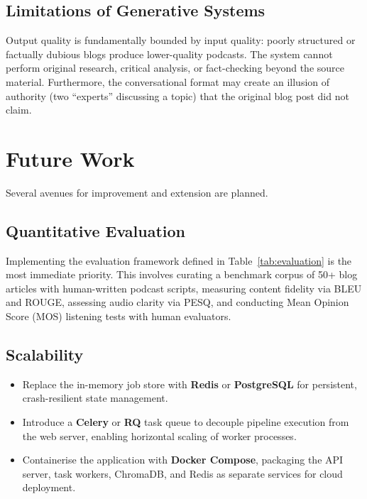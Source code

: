 \documentclass[sigconf,natbib=false]{acmart}   %
\begin{document}
\subsection{Limitations of Generative Systems}
Output quality is fundamentally bounded by input quality: poorly structured or factually dubious blogs produce lower-quality podcasts.  The system cannot perform original research, critical analysis, or fact-checking beyond the source material.  Furthermore, the conversational format may create an illusion of authority (two ``experts'' discussing a topic) that the original blog post did not claim.

\section{Future Work}
\label{sec:future}

Several avenues for improvement and extension are planned.

\subsection{Quantitative Evaluation}
Implementing the evaluation framework defined in Table~\ref{tab:evaluation} is the most immediate priority.  This involves curating a benchmark corpus of 50+ blog articles with human-written podcast scripts, measuring content fidelity via BLEU and ROUGE, assessing audio clarity via PESQ, and conducting Mean Opinion Score (MOS) listening tests with human evaluators.

\subsection{Scalability}
\begin{itemize}[nosep]
  \item Replace the in-memory job store with \textbf{Redis} or \textbf{PostgreSQL} for persistent, crash-resilient state management.
  \item Introduce a \textbf{Celery} or \textbf{RQ} task queue to decouple pipeline execution from the web server, enabling horizontal scaling of worker processes.
  \item Containerise the application with \textbf{Docker Compose}, packaging the API server, task workers, ChromaDB, and Redis as separate services for cloud deployment.
\end{itemize}
\end{document}
